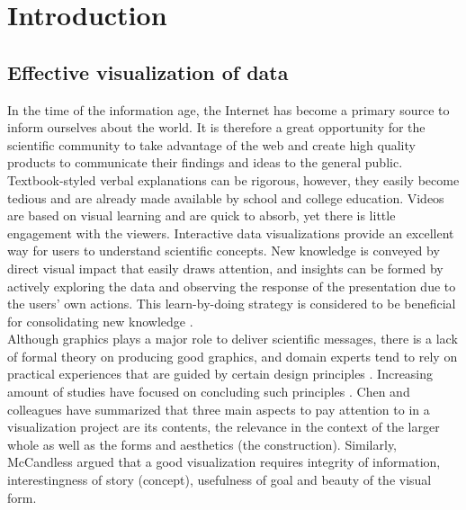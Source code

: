 \documentclass[11pt, a4paper,oneside,chapterprefix=false]{scrbook}
\begin{document}


\tableofcontents

\mainmatter


\chapter{Introduction} \label{chp:introduction}

\section{Effective visualization of data} \label{sec:one}
In the time of the information age, the Internet has become a primary source to inform ourselves about the world. It is therefore a great opportunity for the scientific community to take advantage of the web and create high quality products to communicate their findings and ideas to the general public. Textbook-styled verbal explanations can be rigorous, however, they easily become tedious and are already made available by school and college education. Videos are based on visual learning and are quick to absorb, yet there is little engagement with the viewers. Interactive data visualizations provide an excellent way for users to understand scientific concepts. New knowledge is conveyed by direct visual impact that easily draws attention, and insights can be formed by actively exploring the data and observing the response of the presentation due to the users' own actions. This learn-by-doing strategy is considered to be beneficial for consolidating new knowledge \cite{schank1995we}. \\

Although graphics plays a major role to deliver scientific messages, there is a lack of formal theory on producing good graphics, and domain experts tend to rely on practical experiences that are guided by certain design principles \cite{chen2007handbook}. Increasing amount of studies have focused on concluding such principles \cite{senay1990rules,evergreen2013design,midway2020principles}. Chen and colleagues \cite{chen2007handbook} have summarized that three main aspects to pay attention to in a visualization project are its contents, the relevance in the context of the larger whole as well as the forms and aesthetics (the construction). Similarly, McCandless argued that a good visualization requires integrity of information, interestingness of story (concept), usefulness of goal and beauty of the visual form.\\
\end{document}
